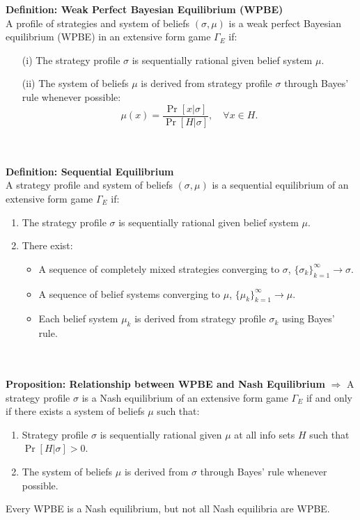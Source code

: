 \documentclass{article}
\begin{document}
\textbf{Definition: Weak Perfect Bayesian Equilibrium (WPBE)} \\
A profile of strategies and system of beliefs $(\sigma, \mu)$ is a weak perfect Bayesian equilibrium (WPBE) in an extensive form game $\Gamma_E$ if:
\begin{itemize}
    \item[(i)] The strategy profile $\sigma$ is sequentially rational given belief system $\mu$.
    \item[(ii)] The system of beliefs $\mu$ is derived from strategy profile $\sigma$ through Bayes’ rule whenever possible:
    \[
    \mu(x) = \frac{\Pr [x | \sigma]}{\Pr [H | \sigma]}, \quad \forall x \in H.
    \]
\end{itemize}
\\
\\
\textbf{Definition: Sequential Equilibrium} \\
A strategy profile and system of beliefs $(\sigma, \mu)$ is a sequential equilibrium of an extensive form game $\Gamma_E$ if:
\begin{enumerate}
    \item The strategy profile $\sigma$ is sequentially rational given belief system $\mu$.
    \item There exist:
    \begin{itemize}
        \item A sequence of completely mixed strategies converging to $\sigma$, $\{\sigma_k\}_{k=1}^{\infty} \to \sigma$.
        \item A sequence of belief systems converging to $\mu$, $\{\mu_k\}_{k=1}^{\infty} \to \mu$.
        \item Each belief system $\mu_k$ is derived from strategy profile $\sigma_k$ using Bayes’ rule.
    \end{itemize}
\end{enumerate} 
\\
\\
\textbf{Proposition: Relationship between WPBE and Nash Equilibrium} $\Rightarrow$ A strategy profile $\sigma$ is a Nash equilibrium of an extensive form game $\Gamma_E$ if and only if there exists a system of beliefs $\mu$ such that:
\begin{enumerate}
    \item Strategy profile $\sigma$ is sequentially rational given $\mu$ at all info sets $H$ such that $\Pr [H | \sigma] > 0$.
    \item The system of beliefs $\mu$ is derived from $\sigma$ through Bayes’ rule whenever possible.
\end{enumerate}
Every WPBE is a Nash equilibrium, but not all Nash equilibria are WPBE.
\end{document}
